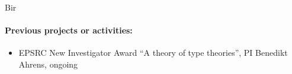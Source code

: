 \begin{sitedescription}{Bir}
\paragraph{Previous projects or activities:}

\begin{itemize}
 \item EPSRC New Investigator Award ``A theory of type theories'', PI Benedikt Ahrens, ongoing
\end{itemize}



% 





\end{sitedescription}
